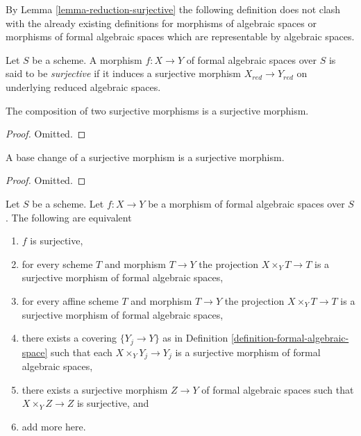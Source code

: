 \noindent
By Lemma \ref{lemma-reduction-surjective} the following definition does
not clash with the already existing definitions for morphisms of algebraic
spaces or morphisms of formal algebraic spaces which are representable
by algebraic spaces.

\begin{definition}
\label{definition-surjective}
Let $S$ be a scheme. A morphism $f : X \to Y$ of formal algebraic spaces
over $S$ is said to be {\it surjective} if it induces a surjective morphism
$X_{red} \to Y_{red}$ on underlying reduced algebraic spaces.
\end{definition}

\begin{lemma}
\label{lemma-composition-surjective}
The composition of two surjective morphisms is a surjective morphism.
\end{lemma}

\begin{proof}
Omitted.
\end{proof}

\begin{lemma}
\label{lemma-base-change-surjective}
A base change of a surjective morphism is a surjective morphism.
\end{lemma}

\begin{proof}
Omitted.
\end{proof}

\begin{lemma}
\label{lemma-characterize-surjective}
Let $S$ be a scheme. Let $f : X \to Y$ be a morphism of formal algebraic
spaces over $S$. The following are equivalent
\begin{enumerate}
\item $f$ is surjective,
\item for every scheme $T$ and morphism $T \to Y$
the projection $X \times_Y T \to T$ is a surjective morphism
of formal algebraic spaces,
\item for every affine scheme $T$ and morphism $T \to Y$
the projection $X \times_Y T \to T$ is a surjective morphism of formal
algebraic spaces,
\item there exists a covering $\{Y_j \to Y\}$ as in
Definition \ref{definition-formal-algebraic-space}
such that each $X \times_Y Y_j \to Y_j$ is a surjective morphism of
formal algebraic spaces,
\item there exists a surjective morphism $Z \to Y$
of formal algebraic spaces such that $X \times_Y Z \to Z$ is surjective, and
\item add more here.
\end{enumerate}
\end{lemma}


